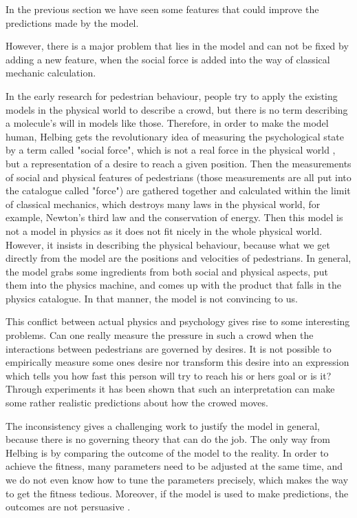 In the previous section we have seen some features that could improve the predictions made by the model.

However, there is a major problem that lies in the model and can not be fixed by adding a new feature, when the social force is added into the way of classical mechanic calculation.

In the early research for pedestrian behaviour, people try to apply the existing models in the physical world to describe a crowd, but there is no term describing 
a molecule's will in models like those. Therefore, in order to make the model human, Helbing gets the revolutionary idea of measuring the psychological state 
by a term called "social force", which is not a real force in the physical world \cite{social-force}, but a representation of a desire to reach a given position. Then the measurements of social and physical features of pedestrians (those measurements are all put into the catalogue called "force") are gathered together and calculated within the limit of classical mechanics, which destroys many laws in the physical world, for example, Newton's third law and the conservation of energy. Then this model is not a model in physics as it does not fit nicely in the whole physical world. However, it insists in describing the physical behaviour, because what we get directly from the model are the positions and velocities of pedestrians. In general, the model grabs some ingredients from both social and physical aspects, put them into the physics machine, and comes up with the product that falls in the physics catalogue. In that manner, the model is not convincing to us.

This conflict between actual physics and psychology gives rise to some interesting problems. Can one really measure the pressure in such a crowd when the interactions between pedestrians are governed by desires. It is not possible to empirically measure some ones desire nor transform this desire into an expression which tells you how fast this person will try to reach his or hers goal or is it?
Through experiments it has been shown that such an interpretation can make some rather realistic predictions about how the crowed moves.

The inconsistency gives a challenging work to justify the model in general, because there is no governing theory that can do the job. The only way from Helbing 
is by comparing the outcome of the model to the reality. In order to achieve the fitness, many parameters need to be adjusted at the same time, and we do not even know how to tune the parameters precisely, which makes the way to get the fitness tedious. Moreover, if the model is used to make predictions, the
outcomes are not persuasive . 

